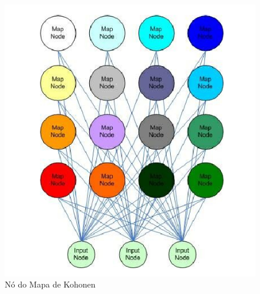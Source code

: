 \begin{figure}[ht]
\centering
\includegraphics[width=1\textwidth]{imgs/node-som.png}
\caption{Nó do Mapa de Kohonen}
\label{fig:som-node}
\end{figure}